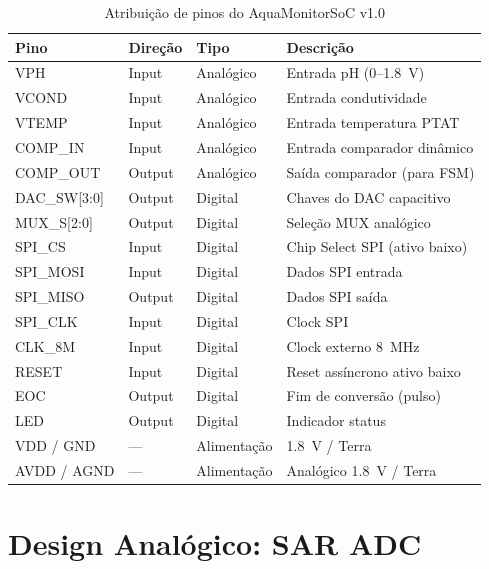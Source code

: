 \documentclass[12pt,a4paper]{article}
\begin{document}
\begin{table}[H]
  \centering
  \caption{Atribuição de pinos do AquaMonitorSoC v1.0}
  \label{tab:pinout}
  \begin{tabular}{llll}
    \toprule
    \textbf{Pino} & \textbf{Direção} & \textbf{Tipo} & \textbf{Descrição} \\
    \midrule
    VPH       & Input  & Analógico & Entrada pH (0--\SI{1.8}{\volt}) \\
    VCOND     & Input  & Analógico & Entrada condutividade \\
    VTEMP     & Input  & Analógico & Entrada temperatura PTAT \\
    COMP\_IN  & Input  & Analógico & Entrada comparador dinâmico \\
    COMP\_OUT & Output & Analógico & Saída comparador (para FSM) \\
    DAC\_SW[3:0] & Output & Digital & Chaves do DAC capacitivo \\
    MUX\_S[2:0]  & Output & Digital & Seleção MUX analógico \\
    SPI\_CS   & Input  & Digital   & Chip Select SPI (ativo baixo) \\
    SPI\_MOSI & Input  & Digital   & Dados SPI entrada \\
    SPI\_MISO & Output & Digital   & Dados SPI saída \\
    SPI\_CLK  & Input  & Digital   & Clock SPI \\
    CLK\_8M   & Input  & Digital   & Clock externo \SI{8}{\mega\hertz} \\
    RESET     & Input  & Digital   & Reset assíncrono ativo baixo \\
    EOC       & Output & Digital   & Fim de conversão (pulso) \\
    LED       & Output & Digital   & Indicador status \\
    VDD / GND & ---    & Alimentação & \SI{1.8}{\volt} / Terra \\
    AVDD / AGND & ---  & Alimentação & Analógico \SI{1.8}{\volt} / Terra \\
    \bottomrule
  \end{tabular}
\end{table}

\newpage

\section{Design Analógico: SAR ADC}
\label{sec:analog}
\end{document}
